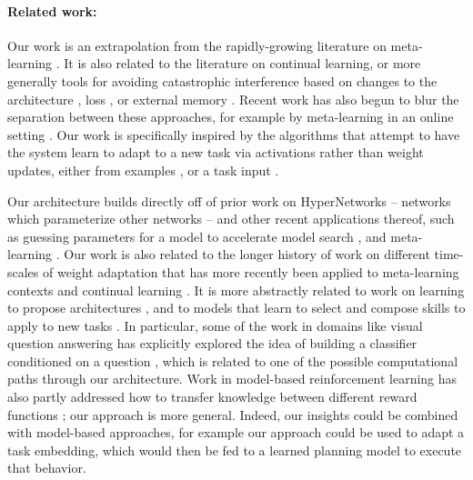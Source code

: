 \documentclass{article}
\begin{document}
\paragraph{Related work:} Our work is an extrapolation from the rapidly-growing literature on meta-learning \citep[e.g.][]{Vinyals2016, Santoro2016, Finn2017a, Finn2018, Stadie2018, Botvinick2019}. It is also related to the literature on continual learning, or more generally tools for avoiding catastrophic interference based on changes to the architecture \citep[e.g.][]{Fernando2017, Rusu2016}, loss \citep[e.g.][]{Kirkpatrick2016, Zenke2017, Aljundi2019}, or external memory \citep[e.g.][]{Sprechmann2018}. Recent work has also begun to blur the separation between these approaches, for example by meta-learning in an online setting \citep{Finn2019}. Our work is specifically inspired by the algorithms that attempt to have the system learn to adapt to a new task via activations rather than weight updates, either from examples \citep[e.g.][]{Wang2016a, Duan2016}, or a task input \citep[e.g.][]{Borsa2019}. \par
Our architecture builds directly off of prior work on HyperNetworks \citep{Ha2016} -- networks which parameterize other networks -- and other recent applications thereof, such as guessing parameters for a model to accelerate model search \citep[e.g.][]{Brock2018a, Zhang2019}, and meta-learning \citep[e.g.]{Li2019a, Rusu2019}. Our work is also related to the longer history of work on different time-scales of weight adaptation \citep{Hinton1982, Kumaran2016} that has more recently been applied to meta-learning contexts \citep[e.g.][]{Ba2016, Munkhdalai2017, Garnelo2018} and continual learning \citep[e.g.]{Hu2019}. It is more abstractly related to work on learning to propose architectures \citep[e.g.][]{Zoph2016, Cao2019}, and to models that learn to select and compose skills to apply to new tasks \citep[e.g.][]{Andreas, Andreas2016, Tessler2016, Reed2015, Chang2019a}. In particular, some of the work in domains like visual question answering has explicitly explored the idea of building a classifier conditioned on a question \citep{Andreas, Andreasa}, which is related to one of the possible computational paths through our architecture. Work in model-based reinforcement learning has also partly addressed how to transfer knowledge between different reward functions \citep[e.g.][]{Laroche2017}; our approach is more general. Indeed, our insights could be combined with model-based approaches, for example our approach could be used to adapt a task embedding, which would then be fed to a learned planning model to execute that behavior.\par 
\end{document}
